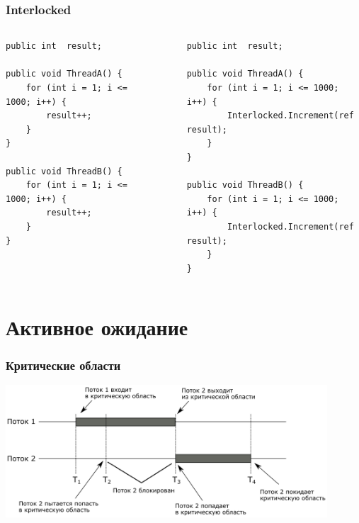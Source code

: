 \documentclass{../../slides-style}
\begin{document}
    \begin{frame}[fragile]
        \frametitle{Interlocked}
        \begin{small}
            \begin{columns}
                \begin{column}{0.4\textwidth}
                    \begin{verbatim}
public int  result;

public void ThreadA() {
    for (int i = 1; i <= 1000; i++) {
        result++;
    }
}

public void ThreadB() {
    for (int i = 1; i <= 1000; i++) {
        result++; 
    }
}
                    \end{verbatim}
                \end{column}
                \begin{column}{0.05\textwidth}
                    \rule{0.1mm}{0.8\textheight}
                \end{column}
                \begin{column}{0.5\textwidth}
                    \begin{verbatim}
public int  result;

public void ThreadA() {
    for (int i = 1; i <= 1000; i++) {
        Interlocked.Increment(ref result);
    }
}

public void ThreadB() {
    for (int i = 1; i <= 1000; i++) {
        Interlocked.Increment(ref result); 
    }
}
                    \end{verbatim}
                \end{column}
            \end{columns}
        \end{small}
    \end{frame}

    \section{Активное ожидание}

    \begin{frame}
        \frametitle{Критические области}
        \begin{center}
            \includegraphics[width=0.9\textwidth]{criticalSections.png}
        \end{center}
    \end{frame}
\end{document}
